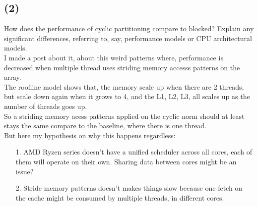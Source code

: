 \documentclass[]{article}
\begin{document}
    \subsection*{(2)}
        How does the performance of cyclic partitioning compare to blocked?  Explain any significant differences, referring to, say, performance models or CPU architectural models.
        \\[1.1em]
        I made a post about it, about this weird patterns where, performance is decreased when multiple thread uses striding memory accesss patterns on the array. 
        \\
        The roofline model shows that, the memory scale up when there are 2 threads, but scale down again when it grows to 4, and the L1, L2, L3, all scales up as the number of threads goes up. 
        \\
        So a striding memory acess patterns applied on the cyclic norm should at least stays the same compare to the baseline, where there is one thread. 
        \\
        But here my hypothesis on why this happens regardless: 
        \begin{enumerate}
            \item[1.] AMD Ryzen series doesn't have a unified scheduler across all cores, each of them will operate on their own. Sharing data between cores might be an issue? 
            \item[2.] Stride memory patterns doesn't makes things slow because one fetch on the cache might be consumed by multiple threads, in different cores. 
        \end{enumerate}
\end{document}
